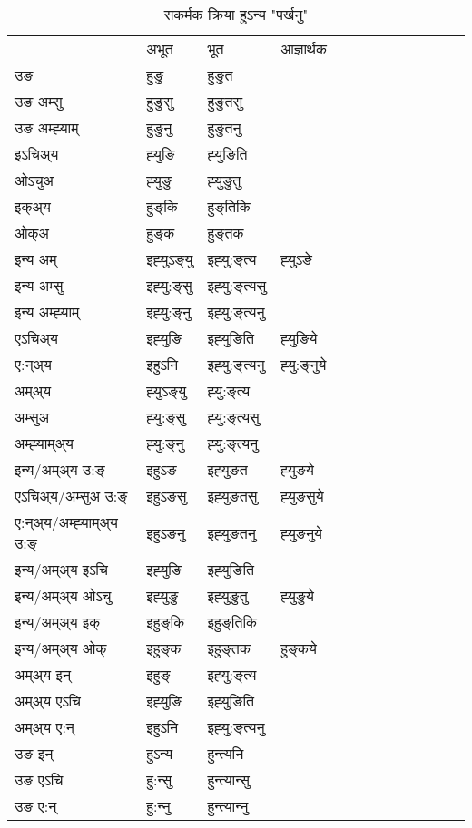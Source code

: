 \begin{table}[H]
\label{uŋ.vt} \centering
\caption{सकर्मक क्रिया  हुऽन्य  "पर्खनु"  }
\begin{tabular}{l|l|l|l|l|l|l|l|l|l|l|l|l}  \toprule
&अभूत & भूत & आज्ञार्थक \\ 
उङ &हुङु &हुङुत \\ 
उङ अम्सु &हुङुसु &हुङुतसु \\ 
उङ अम्ह्‍याम् &हुङुनु &हुङुतनु \\ 
इऽचिअ्य &ह्‍युङि &ह्‍युङिति   \\ 
ओऽचुअ &ह्‍युङु &ह्‍युङुतु   \\ 
इक्अ्य &हुङ्‌कि &हुङ्‌तिकि   \\ 
ओक्अ &हुङ्‌क &हुङ्‌तक   \\ 
इन्य अम् & इह्‍युऽङ्‌यु  & इह्‍यु:ङ्‌त्य &ह्‍युऽङे  \\ 
इन्य अम्सु & इह्‍यु:ङ्‌सु  & इह्‍यु:ङ्‌त्यसु   \\ 
इन्य अम्ह्‍याम् & इह्‍यु:ङ्‌नु  & इह्‍यु:ङ्‌त्यनु   \\ 
एऽचिअ्य & इह्‍युङि & इह्‍युङिति &ह्‍युङिये    \\ 
ए:न्अ्य & इहुऽनि  & इह्‍यु:ङ्‌त्यनु &ह्‍यु:ङ्‌नुये  \\ 
अम्अ्य & ह्‍युऽङ्‌यु  & ह्‍यु:ङ्‌त्य  \\ 
अम्सुअ & ह्‍यु:ङ्‌सु & ह्‍यु:ङ्‌त्यसु  \\ 
अम्ह्‍याम्अ्य & ह्‍यु:ङ्‌नु  & ह्‍यु:ङ्‌त्यनु \\ 
\midrule
इन्य/अम्अ्य उ:ङ्‌&इहुऽङ & इह्‍युङत &ह्‍युङये \\ 
एऽचिअ्य/अम्सुअ उ:ङ्‌ &इहुऽङसु & इह्‍युङतसु &ह्‍युङसुये \\ 
ए:न्अ्य/अम्ह्‍याम्अ्य उ:ङ्‌ &इहुऽङनु & इह्‍युङतनु &ह्‍युङनुये \\ 
इन्य/अम्अ्य इऽचि & इह्‍युङि & इह्‍युङिति    \\ 
इन्य/अम्अ्य ओऽचु & इह्‍युङु & इह्‍युङुतु  &ह्‍युङुये  \\ 
इन्य/अम्अ्य इक् & इहुङ्‌कि & इहुङ्‌तिकि   \\ 
इन्य/अम्अ्य ओक् & इहुङ्‌क & इहुङ्‌तक  &हुङ्‌कये  \\ 
अम्अ्य इन् & इहुङ्‌ & इह्‍यु:ङ्‌त्य   \\ 
अम्अ्य एऽचि & इह्‍युङि & इह्‍युङिति    \\ 
अम्अ्य ए:न् & इहुऽनि  & इह्‍यु:ङ्‌त्यनु  \\ 
\midrule
उङ इन् & हुऽन्य  & हुन्त्यनि  \\ 
उङ एऽचि & हु:न्सु  & हुन्त्यान्सु   \\ 
उङ ए:न्& हु:न्‍नु  & हुन्त्यान्‍नु   \\ 
\bottomrule
\end{tabular}
\end{table}


